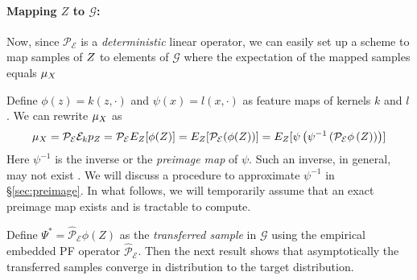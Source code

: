 \paragraph{Mapping $Z$ to $\mathcal{G}$:} Now, since  $\mathcal{P_\mathcal{E}}$ is a {\em deterministic} linear operator, we can easily set up a scheme to map samples of $\var{z}$ to elements of $\mathcal{G}$ where the expectation of the mapped samples equals $\mu_{\var{x}}$


Define $\phi(z) = k(z, \cdot)$ and $\psi(x) = l(x, \cdot)$ as feature maps of kernels $k$ and $l$. We can rewrite $\mu_{\var{x}}$  as 
\begin{align}
{{\mu}_{\var{x}}} = \mathcal{P}_\mathcal{E}\mathcal{E}_k {p_{\var{z}}}  
                = \mathcal{P}_\mathcal{E}E_{\var{z}}[\phi(\var{z})]
                = E_{\var{z}}[\mathcal{P}_\mathcal{E}(\phi(\var{Z}))]
                = E_{\var{Z}}[\psi\left(\psi^{-1}\left(\mathcal{P}_\mathcal{E} \phi\left(\var{z}\right)\right)\right)]
\label{eq:approx_sample}
\end{align}
Here $\psi^{-1}$ is the inverse or the \textit{preimage map} of $\psi$. Such an inverse, in general, may not exist \citep{kwok2004pre,honeine2011preimage}. We will discuss a procedure to approximate $\psi^{-1}$ in \S\ref{sec:preimage}. In what follows, we will temporarily assume that an exact preimage map exists and is tractable to compute. 

Define $\Psi^* = \hat{\mathcal{P}}_\mathcal{E} \phi(Z)$ as the \textit{transferred sample} in $\mathcal{G}$ using the empirical embedded PF operator $\hat{\mathcal{P}}_\mathcal{E}$. Then the next result shows that asymptotically the transferred samples converge in distribution to the target distribution. 

